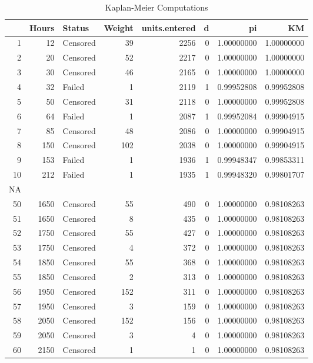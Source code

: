 \documentclass{article}
\begin{document}
\begin{center}
\begin{table}[ht]
\begin{center}
\begin{tabular}{rrlrrrrr}
  \hline
 & Hours & Status & Weight & units.entered & d & pi & KM \\ 
  \hline
1 & 12 & Censored & 39 & 2256 & 0 & 1.00000000 & 1.00000000 \\ 
  2 & 20 & Censored & 52 & 2217 & 0 & 1.00000000 & 1.00000000 \\ 
  3 & 30 & Censored & 46 & 2165 & 0 & 1.00000000 & 1.00000000 \\ 
  4 & 32 & Failed & 1 & 2119 & 1 & 0.99952808 & 0.99952808 \\ 
  5 & 50 & Censored & 31 & 2118 & 0 & 1.00000000 & 0.99952808 \\ 
  6 & 64 & Failed & 1 & 2087 & 1 & 0.99952084 & 0.99904915 \\ 
  7 & 85 & Censored & 48 & 2086 & 0 & 1.00000000 & 0.99904915 \\ 
  8 & 150 & Censored & 102 & 2038 & 0 & 1.00000000 & 0.99904915 \\ 
  9 & 153 & Failed & 1 & 1936 & 1 & 0.99948347 & 0.99853311 \\ 
  10 & 212 & Failed & 1 & 1935 & 1 & 0.99948320 & 0.99801707 \\ 
  NA &  &  &  &  &  &  &  \\ 
  50 & 1650 & Censored & 55 & 490 & 0 & 1.00000000 & 0.98108263 \\ 
  51 & 1650 & Censored & 8 & 435 & 0 & 1.00000000 & 0.98108263 \\ 
  52 & 1750 & Censored & 55 & 427 & 0 & 1.00000000 & 0.98108263 \\ 
  53 & 1750 & Censored & 4 & 372 & 0 & 1.00000000 & 0.98108263 \\ 
  54 & 1850 & Censored & 55 & 368 & 0 & 1.00000000 & 0.98108263 \\ 
  55 & 1850 & Censored & 2 & 313 & 0 & 1.00000000 & 0.98108263 \\ 
  56 & 1950 & Censored & 152 & 311 & 0 & 1.00000000 & 0.98108263 \\ 
  57 & 1950 & Censored & 3 & 159 & 0 & 1.00000000 & 0.98108263 \\ 
  58 & 2050 & Censored & 152 & 156 & 0 & 1.00000000 & 0.98108263 \\ 
  59 & 2050 & Censored & 3 & 4 & 0 & 1.00000000 & 0.98108263 \\ 
  60 & 2150 & Censored & 1 & 1 & 0 & 1.00000000 & 0.98108263 \\ 
   \hline
\end{tabular}
\caption{Kaplan-Meier Computations}
\label{tab:one}
\end{center}
\end{table}\end{center}
\FloatBarrier
\end{document}
